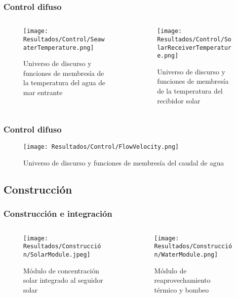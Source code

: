 \begin{frame}
	\frametitle{Control difuso}
	\vspace*{2mm}
	\begin{columns}
		\begin{column}{0.5\linewidth}
			\begin{figure}
				\centering
				\texttt{[image: Resultados/Control/SeawaterTemperature.png]}
				\caption{Universo de discurso y funciones de membresía de la temperatura del agua de mar entrante}
			\end{figure}
		\end{column}
		\begin{column}{0.5\linewidth}
			\begin{figure}
				\centering
				\texttt{[image: Resultados/Control/SolarReceiverTemperature.png]}
				\caption{Universo de discurso y funciones de membresía de la temperatura del recibidor solar}
			\end{figure}
		\end{column}
	\end{columns}
\end{frame}

\begin{frame}
	\frametitle{Control difuso}
	
	\begin{figure}
		\centering
		\texttt{[image: Resultados/Control/FlowVelocity.png]}
		\caption{Universo de discurso y funciones de membresía del caudal de agua}
	\end{figure}
\end{frame}

\subsection{Construcción}
\begin{frame}
	\frametitle{Construcción e integración}
	\begin{columns}
		\begin{column}{0.5\linewidth}
			\begin{figure}
				\centering
				\texttt{[image: Resultados/Construcción/SolarModule.jpeg]}
				\caption{Módulo de concentración solar integrado al seguidor solar}
			\end{figure}
		\end{column}
		\begin{column}{0.5\linewidth}
			\begin{figure}
				\centering
				\texttt{[image: Resultados/Construcción/WaterModule.png]}
				\caption{Módulo de reaprovechamiento térmico y bombeo}
			\end{figure}
		\end{column}
	\end{columns}
\end{frame}

